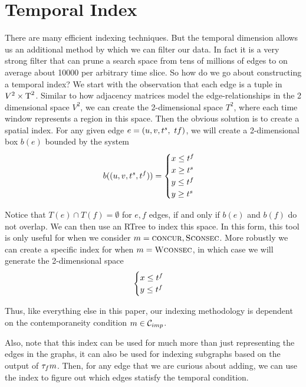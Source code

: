\section{Temporal Index}

There are many efficient indexing techniques. But the temporal dimension allows
us an additional method by which we can filter our data. In fact it is a very
strong filter that can prune a search space from tens of millions of edges to on
average about 10000 per arbitrary time slice. So how do we go about constructing
a temporal index?  We start with the observation that each edge is a tuple in
$V^2 \times \text{T}^2$. Similar to how adjacency matrices model the
edge-relationships in the 2 dimensional space $V^2$, we can create the
2-dimensional space $T^2$, where each time window represents a region in this
space. Then the obvious solution is to create a spatial index. For any given
edge $e = (u,v, t^s,\ tf)$, we will create a 2-dimensional box $b(e)$ bounded by
the system
\[b((u,v, t^s, t^f)) =
  \begin{cases}
    x \leq t^f \\
    x \geq t^s \\
    y \leq t^f \\
    y \geq t^s
  \end{cases}
\]

Notice that $T(e) \cap T(f) = \emptyset$ for $e,f$ edges, if and only if $b(e)$
and $b(f)$ do not overlap. We can then use an RTree \cite{1984-SIGMOD-RTree} to
index this space. In this form, this tool is only useful for when we consider
$m = \textsc{concur}, \textsc{Sconsec}$.  More robustly we can create a specific
index for when $m = \textsc{Wconsec}$, in which case we will generate the
2-dimensional space
\[ \begin{cases}
     x \leq t^f \\
     y \leq t^f
   \end{cases}
\]

Thus, like everything else in this paper, our indexing methodology is dependent
on the contemporaneity condition $m \in \mathcal{C}_{imp}$. 

Also, note that this index can be used for much more than just representing the
edges in the graphs, it can also be used for indexing subgraphs based on the output
of $\tau_f{m}$.  Then, for any edge that we are curious about adding, we can use
the index to figure out which edges statisfy the temporal condition.

  
